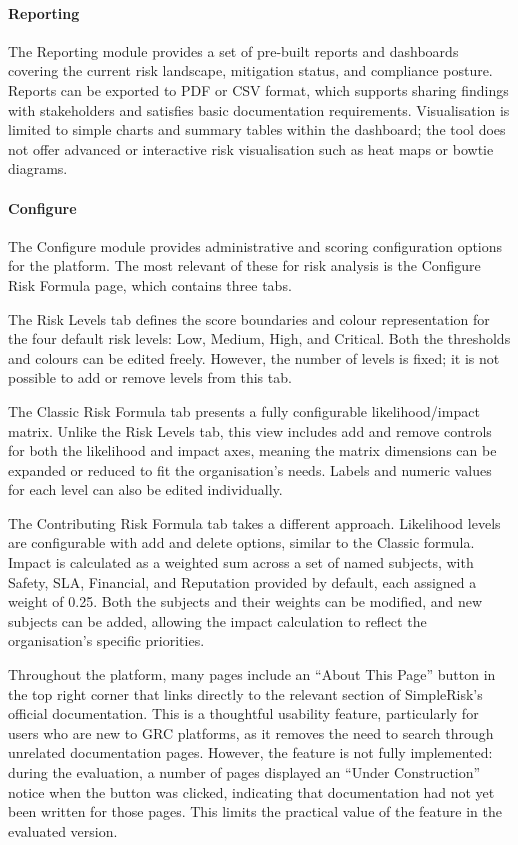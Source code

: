 \paragraph{Reporting}
The Reporting module provides a set of pre-built reports and dashboards covering the
current risk landscape, mitigation status, and compliance posture. Reports can be
exported to PDF or CSV format, which supports sharing findings with stakeholders and
satisfies basic documentation requirements. Visualisation is limited to simple charts
and summary tables within the dashboard; the tool does not offer advanced or interactive
risk visualisation such as heat maps or bowtie diagrams.

\paragraph{Configure}
The Configure module provides administrative and scoring configuration options for the
platform. The most relevant of these for risk analysis is the Configure Risk Formula
page, which contains three tabs.

The Risk Levels tab defines the score boundaries and colour representation for the four
default risk levels: Low, Medium, High, and Critical. Both the thresholds and colours
can be edited freely. However, the number of levels is fixed; it is not possible to add
or remove levels from this tab.

The Classic Risk Formula tab presents a fully configurable likelihood/impact matrix.
Unlike the Risk Levels tab, this view includes add and remove controls for both the
likelihood and impact axes, meaning the matrix dimensions can be expanded or reduced to
fit the organisation's needs. Labels and numeric values for each level can also be
edited individually.

The Contributing Risk Formula tab takes a different approach. Likelihood levels are
configurable with add and delete options, similar to the Classic formula. Impact is
calculated as a weighted sum across a set of named subjects, with Safety, SLA,
Financial, and Reputation provided by default, each assigned a weight of 0.25. Both
the subjects and their weights can be modified, and new subjects can be added, allowing
the impact calculation to reflect the organisation's specific priorities.

Throughout the platform, many pages include an ``About This Page'' button in the top
right corner that links directly to the relevant section of SimpleRisk's official
documentation. This is a thoughtful usability feature, particularly for users who are
new to GRC platforms, as it removes the need to search through unrelated documentation
pages. However, the feature is not fully implemented: during the evaluation, a number
of pages displayed an ``Under Construction'' notice when the button was clicked,
indicating that documentation had not yet been written for those pages. This limits
the practical value of the feature in the evaluated version.

